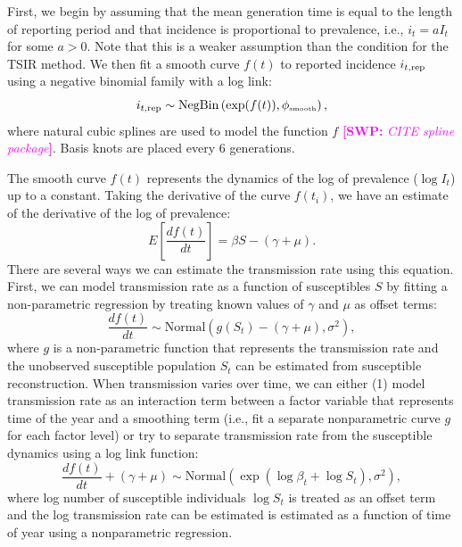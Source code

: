 \documentclass{article}
\newcommand{\comment}[3]{\textcolor{#1}{\textbf{[#2: }\textsl{#3}\textbf{]}}}
\newcommand{\swp}[1]{\comment{magenta}{SWP}{#1}}
\newcommand{\tsub}[2]{#1_{{\textrm{\tiny #2}}}}
\begin{document}
First, we begin by assuming that the mean generation time is equal to the length of reporting period and that incidence is proportional to prevalence, i.e., $i_t = a I_t$ for some $a > 0$. 
Note that this is a weaker assumption than the condition for the TSIR method.
We then fit a smooth curve $f(t)$ to reported incidence $i_{t, {\tiny \textrm{rep}}}$ using a negative binomial family with a log link:
\begin{equation}
i_{t, {\tiny \textrm{rep}}} \sim \mathrm{NegBin}\left(\exp (f(t)), \tsub{\phi}{smooth} \right),
\end{equation}
where natural cubic splines are used to model the function $f$ \swp{CITE spline package}.
Basis knots are placed every 6 generations.

The smooth curve $f(t)$ represents the dynamics of the log of prevalence ($\log I_t$) up to a constant.
Taking the derivative of the curve $f(t_i)$, we have an estimate of the derivative of the log of prevalence:
\begin{equation}
E\left[\frac{df(t)}{dt}\right] = \beta S - (\gamma + \mu).
\end{equation}
There are several ways we can estimate the transmission rate using this equation.
First, we can model transmission rate as a function of susceptibles $S$ by fitting a non-parametric regression by treating known values of $\gamma$ and $\mu$ as offset terms:
\begin{equation}
\frac{df(t)}{dt} \sim \mathrm{Normal}(g(S_t) - (\gamma + \mu), \sigma^2),
\end{equation}
where $g$ is a non-parametric function that represents the transmission rate and the unobserved susceptible population $S_t$ can be estimated from susceptible reconstruction.
When transmission varies over time, we can either (1) model transmission rate as an interaction term between a factor variable that represents time of the year and a smoothing term (i.e., fit a separate nonparametric curve $g$ for each factor level) or try to separate transmission rate from the susceptible dynamics using a log link function:
\begin{equation}
\frac{d f(t)}{dt} + (\gamma + \mu) \sim \mathrm{Normal}\left(\exp \left(\log \beta_t + \log S_t\right), \sigma^2\right),
\end{equation}
where log number of susceptible individuals $\log S_t$ is treated as an offset term and the log transmission rate can be estimated is estimated as a function of time of year using a nonparametric regression.
\end{document}
